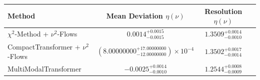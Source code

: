     \begin{tabular}{lccc}
        \toprule
        Method & Mean Deviation $\eta({\nu})$ & Resolution $\eta({\nu})$ \\
        \midrule
        $\chi^2$-Method + $\nu^2$-Flows & $0.0014^{+0.0015}_{-0.0015}$ & $1.3509^{+0.0014}_{-0.0010}$ \\
        CompactTransformer + $\nu^2$-Flows & $(8.00000000^{+17.00000000}_{-12.00000000})\times 10^{-4}$ & $1.3502^{+0.0017}_{-0.0014}$ \\
        MultiModalTransformer & $-0.0025^{+0.0014}_{-0.0010}$ & $1.2544^{+0.0008}_{-0.0009}$ \\
        \bottomrule
    \end{tabular}